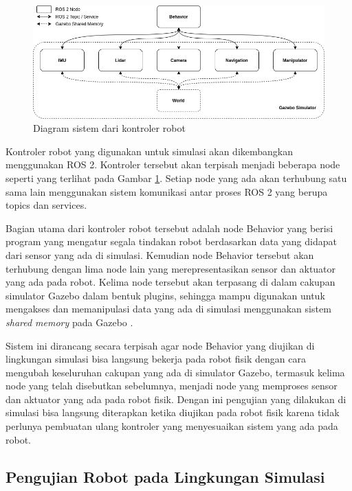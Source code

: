 \begin{figure} [ht] \centering
  \includegraphics[scale=0.45]{gambar/robot-controller.png}
  \caption{Diagram sistem dari kontroler robot}
  \label{fig:RobotController}
\end{figure}

Kontroler robot yang digunakan untuk simulasi akan dikembangkan menggunakan ROS 2.
Kontroler tersebut akan terpisah menjadi beberapa node seperti yang terlihat pada Gambar \ref{fig:RobotController}.
Setiap node yang ada akan terhubung satu sama lain menggunakan sistem komunikasi antar proses ROS 2 yang berupa topics dan services.

Bagian utama dari kontroler robot tersebut adalah node Behavior yang berisi program yang mengatur segala tindakan robot berdasarkan data yang didapat dari sensor yang ada di simulasi.
Kemudian node Behavior tersebut akan terhubung dengan lima node lain yang merepresentasikan sensor dan aktuator yang ada pada robot.
Kelima node tersebut akan terpasang di dalam cakupan simulator Gazebo dalam bentuk plugins, sehingga mampu digunakan untuk mengakses dan memanipulasi data yang ada di simulasi menggunakan sistem \emph{shared memory} pada Gazebo \citep{GazeboPlugins}.

Sistem ini dirancang secara terpisah agar node Behavior yang diujikan di lingkungan simulasi bisa langsung bekerja pada robot fisik dengan cara mengubah keseluruhan cakupan yang ada di simulator Gazebo, termasuk kelima node yang telah disebutkan sebelumnya, menjadi node yang memproses sensor dan aktuator yang ada pada robot fisik.
Dengan ini pengujian yang dilakukan di simulasi bisa langsung diterapkan ketika diujikan pada robot fisik karena tidak perlunya pembuatan ulang kontroler yang menyesuaikan sistem yang ada pada robot.

\subsection{Pengujian Robot pada Lingkungan Simulasi}

